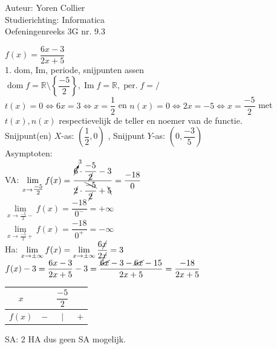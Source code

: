 \documentclass[a4paper]{article}
\newcommand{\asa}{\Leftrightarrow} %
\newcommand{\Lh}{\left(} %
\newcommand{\Rh}{\right)}
\newcommand{\La}{\left\{} %
\newcommand{\Ra}{\right\}}
\newcommand{\pnR}{\rightarrow} %
\newcommand{\limiet}{\lim\limits_}
\newcommand{\schrap}{\cancel}
\newcommand{\schrapb}{\bcancel} %
\newcommand{\vervang}{\cancelto}
\begin{document}
\noindent \large Auteur: Yoren Collier \\
\noindent \large Studierichting: Informatica\\
\noindent \large Oefeningenreeks 3G nr. 9.3\\

\medskip

\normalsize

$f(x) = \dfrac{6x -3}{2x+5}$\\

1. dom, Im, periode, snijpunten assen\\

$\operatorname{dom} f = \mathbb{R} \setminus \La \dfrac{-5}{2} \Ra , \operatorname{Im} f = \mathbb{R}, \operatorname{per.} f = / $\\

$t(x) = 0 \asa 6x = 3 \asa x = \dfrac{1}{2}$ en $n(x) = 0 \asa 2x = -5 \asa x = \dfrac{-5}{2}$ met $t(x), n(x)$ respectievelijk de teller en noemer van de functie.\\

Snijpunt(en) $X$-as: $\Lh \dfrac{1}{2}, 0 \Rh$ , Snijpunt $Y$-as: $\Lh 0, \dfrac{-3}{5} \Rh$\\

Asymptoten:\\

VA: $\limiet{x \pnR \tfrac{-5}{2}} f(x) = \dfrac{\vervang{3}{6} \cdot \dfrac{-5}{\schrap{2}} -3}{\schrap{2} \cdot \dfrac{\schrapb{-5}}{\schrap{2}} + \schrapb{5}} = \dfrac{-18}{0}$\\

$\limiet{x \pnR \tfrac{-5}{2}-} f(x) = \dfrac{-18}{0^-} = +\infty$\\

$\limiet{x \pnR \tfrac{-5}{2}+} f(x) = \dfrac{-18}{0^+} = -\infty$\\

Ha: $\limiet{x \pnR \pm\infty} f(x) = \limiet{x \pnR \pm\infty} \dfrac{6\schrap{x}}{2\schrap{x}} = 3$\\

$f(x) -3 = \dfrac{6x -3}{2x+5} -3 = \dfrac{\schrap{6x} -3 -\schrap{6x} -15}{2x+5} = \dfrac{-18}{2x +5}$\\

\begin{tabular}{c|ccc}
        $x$&       &  $\dfrac{-5}{2}$  &     \\ \hline
     $f(x)$&  $-$  &  $|$              &  $+$
\end{tabular}

SA: 2 HA dus geen SA mogelijk.\\
\end{document}
